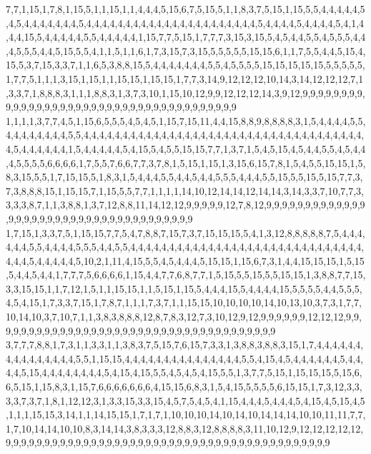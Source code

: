 7,7,1,15,1,7,8,1,15,5,1,1,15,1,1,4,4,4,5,15,6,7,5,15,5,1,1,8,3,7,5,15,1,15,5,5,4,4,4,4,4,5,4,5,4,4,4,4,4,4,4,5,4,4,4,4,4,4,4,4,4,4,4,4,4,4,4,4,4,4,4,4,4,4,5,4,4,4,4,5,4,4,4,4,5,4,1,4,4,4,15,5,4,4,4,4,4,5,5,4,4,4,4,4,1,15,7,7,5,15,1,7,7,7,3,15,3,15,5,4,5,4,4,5,5,4,5,5,5,4,4,4,5,5,5,4,4,5,15,5,5,4,1,1,5,1,1,6,1,7,3,15,7,3,15,5,5,5,5,5,15,15,6,1,1,7,5,5,4,4,5,15,4,15,5,3,7,15,3,3,7,1,1,6,5,3,8,8,15,5,4,4,4,4,4,4,4,5,5,4,5,5,5,5,15,15,15,15,15,5,5,5,5,5,1,7,7,5,1,1,1,3,15,1,15,1,1,15,15,1,15,15,1,7,7,3,14,9,12,12,12,10,14,3,14,12,12,12,7,1,3,3,7,1,8,8,8,3,1,1,1,8,8,3,1,3,7,3,10,1,15,10,12,9,9,12,12,12,14,3,9,12,9,9,9,9,9,9,9,9,9,9,9,9,9,9,9,9,9,9,9,9,9,9,9,9,9,9,9,9,9,9,9,9,9,9,9,9,9,9
1,1,1,1,3,7,7,4,5,1,15,6,5,5,5,4,5,4,5,1,15,7,15,11,4,4,15,8,8,9,8,8,8,8,3,1,5,4,4,4,4,5,5,4,4,4,4,4,4,4,4,5,5,4,4,4,4,4,4,4,4,4,4,4,4,4,4,4,4,4,4,4,4,4,4,4,4,4,4,4,4,4,4,4,4,4,4,4,4,4,5,4,4,4,4,4,4,1,5,4,4,4,4,4,5,4,15,5,4,5,5,15,15,7,7,1,3,7,1,5,4,5,15,4,5,4,4,5,5,4,5,4,4,4,5,5,5,5,6,6,6,6,1,7,5,5,7,6,6,7,7,3,7,8,1,5,15,1,15,1,3,15,6,15,7,8,1,5,4,5,5,15,15,1,5,8,3,15,5,5,1,7,15,15,5,1,8,3,1,5,4,4,4,5,5,4,4,5,4,4,5,5,5,4,4,4,5,5,15,5,5,15,5,15,7,7,3,7,3,8,8,8,15,1,15,15,7,1,15,5,5,7,7,1,1,1,1,14,10,12,14,14,12,14,14,3,14,3,3,7,10,7,7,3,3,3,3,8,7,1,1,3,8,8,1,3,7,12,8,8,11,14,12,12,9,9,9,9,9,12,7,8,12,9,9,9,9,9,9,9,9,9,9,9,9,9,9,9,9,9,9,9,9,9,9,9,9,9,9,9,9,9,9,9,9,9,9,9,9,9
1,7,15,1,3,3,7,5,1,15,15,7,7,5,4,7,8,8,7,15,7,3,7,15,15,15,5,4,1,3,12,8,8,8,8,8,7,5,4,4,4,4,4,4,5,5,4,4,4,4,5,5,5,4,4,5,5,4,4,4,4,4,4,4,4,4,4,4,4,4,4,4,4,4,4,4,4,4,4,4,4,4,4,4,4,4,4,4,4,4,5,4,4,4,4,4,5,10,2,1,11,4,15,5,5,4,5,4,4,4,5,15,15,1,15,6,7,3,1,4,4,15,15,15,1,5,15,5,4,4,5,4,4,1,7,7,7,5,6,6,6,6,1,15,4,4,7,7,6,8,7,7,1,5,15,5,5,15,5,5,15,15,1,3,8,8,7,7,15,3,3,15,15,1,1,7,12,1,5,1,1,15,15,1,1,5,15,1,15,5,4,4,4,15,5,4,4,4,4,15,5,5,5,5,4,4,5,5,5,4,5,4,15,1,7,3,3,7,15,1,7,8,7,1,1,1,7,3,7,1,1,15,15,10,10,10,10,14,10,13,10,3,7,3,1,7,7,10,14,10,3,7,10,7,1,1,3,8,3,8,8,8,12,8,7,8,3,12,7,3,10,12,9,12,9,9,9,9,9,9,12,12,12,9,9,9,9,9,9,9,9,9,9,9,9,9,9,9,9,9,9,9,9,9,9,9,9,9,9,9,9,9,9,9,9,9,9,9,9,9
3,7,7,7,8,8,1,7,3,1,1,3,3,1,1,3,8,3,7,5,15,7,6,15,7,3,3,1,3,8,8,3,8,8,3,15,1,7,4,4,4,4,4,4,4,4,4,4,4,4,4,4,4,5,5,1,15,15,4,4,4,4,4,4,4,4,4,4,4,4,4,4,4,5,5,4,15,4,5,4,4,4,4,4,4,5,4,4,4,4,5,15,4,4,4,4,4,4,4,4,5,4,15,4,15,5,5,4,5,4,5,4,15,5,5,1,3,7,7,5,15,1,15,15,15,5,15,6,6,5,15,1,15,8,3,1,15,7,6,6,6,6,6,6,6,4,15,15,6,8,3,1,5,4,15,5,5,5,5,6,15,15,1,7,3,12,3,3,3,3,7,3,7,1,8,1,12,12,3,1,3,3,15,3,3,15,4,5,7,5,4,5,4,1,15,4,4,4,5,4,4,4,5,4,15,4,5,15,4,5,1,1,1,15,15,3,14,1,1,14,15,15,1,7,1,7,1,10,10,10,14,10,14,10,14,14,14,10,10,11,11,7,7,1,7,10,14,14,10,10,8,3,14,14,3,8,3,3,3,12,8,8,3,12,8,8,8,8,3,11,10,12,9,12,12,12,12,12,9,9,9,9,9,9,9,9,9,9,9,9,9,9,9,9,9,9,9,9,9,9,9,9,9,9,9,9,9,9,9,9,9,9,9,9,9,9,9,9,9,9
